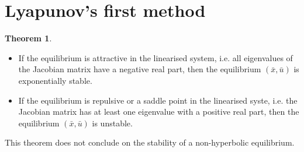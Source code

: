 \documentclass[12pt, openany]{report}
\theoremstyle{definition}
\newtheorem{thm}{Theorem}[chapter]
\begin{document}
\section{Lyapunov's first method}
\begin{thm}
    \begin{itemize}
        \item If the equilibrium is attractive in the linearised system, i.e. all eigenvalues of the Jacobian matrix have a negative real part, then the equilibrium \((\bar x,\bar u)\) is exponentially stable.
        \item If the equilibrium is repulsive or a saddle point in the linearised syste, i.e. the Jacobian matrix has at least one eigenvalue with a positive real part, then the equilibrium \((\bar x,\bar u)\) is unstable. 
    \end{itemize}
\end{thm}
This theorem does not conclude on the stability of a non-hyperbolic equilibrium. 
\end{document}
